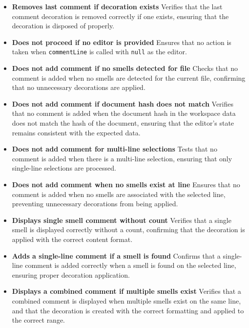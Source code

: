 \documentclass[12pt, titlepage]{article}
\begin{document}
\begin{itemize}
\item \textbf{Removes last comment if decoration exists} \newline
Verifies that the last comment decoration is removed correctly if one exists, ensuring that the decoration is disposed of properly.

\item \textbf{Does not proceed if no editor is provided} \newline
Ensures that no action is taken when \texttt{commentLine} is called with \texttt{null} as the editor.

\item \textbf{Does not add comment if no smells detected for file} \newline
Checks that no comment is added when no smells are detected for the current file, confirming that no unnecessary decorations are applied.

\item \textbf{Does not add comment if document hash does not match} \newline
Verifies that no comment is added when the document hash in the workspace data does not match the hash of the document, ensuring that the editor's state remains consistent with the expected data.

\item \textbf{Does not add comment for multi-line selections} \newline
Tests that no comment is added when there is a multi-line selection, ensuring that only single-line selections are processed.

\item \textbf{Does not add comment when no smells exist at line} \newline
Ensures that no comment is added when no smells are associated with the selected line, preventing unnecessary decorations from being applied.

\item \textbf{Displays single smell comment without count} \newline
Verifies that a single smell is displayed correctly without a count, confirming that the decoration is applied with the correct content format.

\item \textbf{Adds a single-line comment if a smell is found} \newline
Confirms that a single-line comment is added correctly when a smell is found on the selected line, ensuring proper decoration application.

\item \textbf{Displays a combined comment if multiple smells exist} \newline
Verifies that a combined comment is displayed when multiple smells exist on the same line, and that the decoration is created with the correct formatting and applied to the correct range.
\end{itemize}
\end{document}
